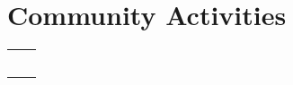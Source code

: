 \documentclass[a4paper, 10pt]{article}
\newcommand{\ExternalLink}{%
	\tikz[x=1.2ex, y=1.2ex, baseline=-0.05ex]{%
		\begin{scope}[x=1ex, y=1ex]
			\clip (-0.1,-0.1) 
			--++ (-0, 1.2) 
			--++ (0.6, 0) 
			--++ (0, -0.6) 
			--++ (0.6, 0) 
			--++ (0, -1);
			\path[draw, 
			line width = 0.5, 
			rounded corners=0.5] 
			(0,0) rectangle (1,1);
		\end{scope}
		\path[draw, line width = 0.5] (0.5, 0.5) 
		-- (1, 1);
		\path[draw, line width = 0.5] (0.6, 1) 
		-- (1, 1) -- (1, 0.6);
	}
}
\begin{document}
\begin{center}
\begin{table}[H]
\begin{adjustwidth}{-.6mm}{-0.5cm}
\begin{tabular}
		\end{tabular}
	\end{adjustwidth}
\end{table}

\vspace{-4ex}
\begin{minipage}[t]{0.48\textwidth}
	

	\vspace{-2ex}
	\section{Community Activities}
	\begin{tabularx}{1\linewidth}{>{\raggedleft\scshape}p{3cm}X}
			\multicolumn{2}{L{250pt}}{{{2015 - Present: Geneva Debate Club \textsuperscript{\href{https://www.clubdedebat.ch/}{\ExternalLink}}}}}\\
			\multicolumn{2}{L{250pt}}{{{2018 - Present : CERN Entrepreneurship Meetups \textsuperscript{\href{https://www.clubdedebat.ch/}{\ExternalLink}}}}}\\
			\multicolumn{2}{L{250pt}}{{{2016 - 2018 : Swiss Cyber-Security meetup \textsuperscript{\href{https://swiss-cybersecurity.ch/}{\ExternalLink}}}}}\\\\
			\multicolumn{2}{L{536pt}}{{{{\large\textbf{\uuline{References:}}} Prof. John Ellis \textsuperscript{\href{https://en.wikipedia.org/wiki/John_Ellis_(physicist)}{\ExternalLink}}, Dr. Markus Nordberg \textsuperscript{\href{https://nordberg.web.cern.ch/}{\ExternalLink}}, Dr. Fran\c{c}ois Grey \textsuperscript{\href{https://en.wikipedia.org/wiki/John_Ellis_(physicist)}{\ExternalLink}}, Dr. Ben Segal \textsuperscript{\href{https://internethalloffame.org/inductees/ben-segal}{\ExternalLink}}
			
		}}}\\
	\end{tabularx}
	
\end{minipage} %
\hfill
\begin{minipage}[t]{0.48\textwidth} 
	\vspace{0pt} %
	

\end{minipage}
\end{center}
\end{document}

